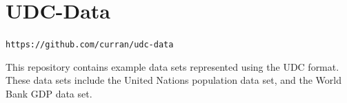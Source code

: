 \documentclass{umthesis}          %
\begin{document}
\section{UDC-Data}
\verb`https://github.com/curran/udc-data`

This repository contains example data sets represented using the UDC format. These data sets include the United Nations population data set, and the World Bank GDP data set.

\backmatter  %




\end{document}

